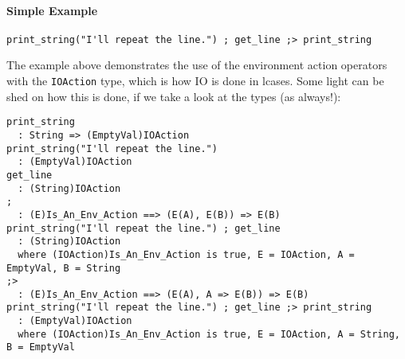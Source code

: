 \documentclass{article}
\begin{document}
\paragraph{Simple Example}
\begin{verbatim}
print_string("I'll repeat the line.") ; get_line ;> print_string
\end{verbatim}
The example above demonstrates the use of the environment action operators with
the \texttt{IOAction} type, which is how IO is done in lcases. Some light can
be shed on how this is done, if we take a look at the types (as always!):
\begin{verbatim}
print_string
  : String => (EmptyVal)IOAction
print_string("I'll repeat the line.")
  : (EmptyVal)IOAction
get_line
  : (String)IOAction
; 
  : (E)Is_An_Env_Action ==> (E(A), E(B)) => E(B) 
print_string("I'll repeat the line.") ; get_line
  : (String)IOAction
  where (IOAction)Is_An_Env_Action is true, E = IOAction, A = EmptyVal, B = String
;>
  : (E)Is_An_Env_Action ==> (E(A), A => E(B)) => E(B) 
print_string("I'll repeat the line.") ; get_line ;> print_string
  : (EmptyVal)IOAction
  where (IOAction)Is_An_Env_Action is true, E = IOAction, A = String, B = EmptyVal
\end{verbatim}
\end{document}
